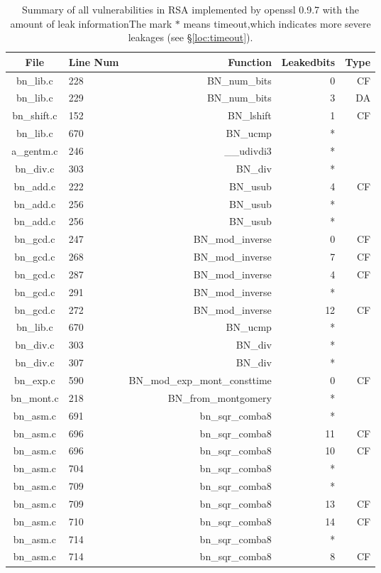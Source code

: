 \begin{table*}%
\centering
\caption{Summary of all vulnerabilities in RSA implemented by openssl 0.9.7 with the amount of leak informationThe mark $*$ means timeout,which indicates more severe leakages (see \S\ref{loc:timeout}).}\label{tab:RSAopenssl}
\begin{tabular}{clrrr}
\hline
\textbf{File} & \textbf{Line Num} & \textbf{Function} & \textbf{Leakedbits} & \textbf{Type} \\\hline
bn\_lib.c&228&BN\_num\_bits&0 &CF\\
bn\_lib.c&229&BN\_num\_bits&3 &DA\\
bn\_shift.c&152&BN\_lshift&1 &CF\\
bn\_lib.c&670&BN\_ucmp&*&\\
a\_gentm.c&246&\_\_udivdi3&*&\\
bn\_div.c&303&BN\_div&*&\\
bn\_add.c&222&BN\_usub&4 &CF\\
bn\_add.c&256&BN\_usub&*&\\
bn\_add.c&256&BN\_usub&*&\\
bn\_gcd.c&247&BN\_mod\_inverse&0 &CF\\
bn\_gcd.c&268&BN\_mod\_inverse&7 &CF\\
bn\_gcd.c&287&BN\_mod\_inverse&4 &CF\\
bn\_gcd.c&291&BN\_mod\_inverse&*&\\
bn\_gcd.c&272&BN\_mod\_inverse&12&CF\\
bn\_lib.c&670&BN\_ucmp&*&\\
bn\_div.c&303&BN\_div&*&\\
bn\_div.c&307&BN\_div&*&\\
bn\_exp.c&590&BN\_mod\_exp\_mont\_consttime&0 &CF\\
bn\_mont.c&218&BN\_from\_montgomery&*&\\
bn\_asm.c&691&bn\_sqr\_comba8&*&\\
bn\_asm.c&696&bn\_sqr\_comba8&11&CF\\
bn\_asm.c&696&bn\_sqr\_comba8&10&CF\\
bn\_asm.c&704&bn\_sqr\_comba8&*&\\
bn\_asm.c&709&bn\_sqr\_comba8&*&\\
bn\_asm.c&709&bn\_sqr\_comba8&13&CF\\
bn\_asm.c&710&bn\_sqr\_comba8&14&CF\\
bn\_asm.c&714&bn\_sqr\_comba8&*&\\
bn\_asm.c&714&bn\_sqr\_comba8&8 &CF\\

\end{tabular}
\end{table*}

